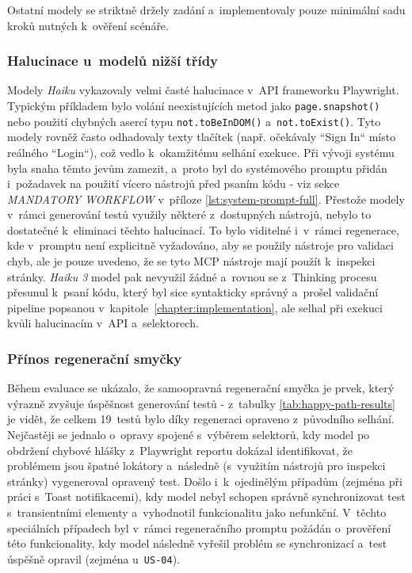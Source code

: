 \documentclass[czech, ing, kiv, he, iso690numb, viewonly]{fasthesis}
\begin{document}
Ostatní modely se striktně držely zadání a~implementovaly
pouze minimální sadu kroků nutných k~ověření scénáře.

\subsubsection*{Halucinace u~modelů nižší třídy}
Modely \textit{Haiku} vykazovaly velmi časté halucinace v~API frameworku Playwright.
Typickým příkladem bylo volání neexistujících metod jako \texttt{page.snapshot()} nebo použití
chybných asercí typu \texttt{not.toBeInDOM()} a~\texttt{not.toExist()}. 
Tyto modely rovněž často odhadovaly texty tlačítek (např. očekávaly ``Sign In`` místo reálného ``Login``), 
což vedlo k~okamžitému selhání exekuce. Při vývoji systému byla snaha těmto 
jevům zamezit, a~proto byl do systémového promptu přidán i~požadavek na použití vícero 
nástrojů před psaním kódu - viz sekce \textit{MANDATORY WORKFLOW} v~příloze \ref{lst:system-prompt-full}.
Přestože modely v~rámci generování testů využily některé z~dostupných nástrojů,
nebylo to dostatečné k~eliminaci těchto halucinací. To bylo viditelné i~v~rámci 
regenerace, kde v~promptu není explicitně vyžadováno, aby se použily nástroje pro validaci chyb, 
ale je pouze uvedeno, že se tyto MCP nástroje mají použít k~inspekci stránky. 
\textit{Haiku 3} model pak nevyužil žádné a~rovnou se z~Thinking procesu 
přesunul k~psaní kódu, který byl sice syntakticky správný a~prošel validační 
pipeline popsanou v~kapitole~\ref{chapter:implementation}, 
ale selhal při exekuci kvůli halucinacím v~API a~selektorech.

\subsubsection*{Přínos regenerační smyčky}
Během evaluace se ukázalo, že samoopravná regenerační smyčka je prvek, který 
výrazně zvyšuje úspěšnost generování testů - z~tabulky \ref{tab:happy-path-results} je vidět, 
že celkem 19~testů bylo díky regeneraci opraveno z~původního selhání.
Nejčastěji se jednalo o~opravy spojené s~výběrem selektorů, 
kdy model po obdržení chybové hlášky z~Playwright reportu dokázal identifikovat, 
že problémem jsou špatné lokátory a~následně (s~využitím nástrojů pro inspekci stránky)
vygeneroval opravený test. Došlo i~k~ojedinělým případům (zejména při práci s~Toast notifikacemi),
kdy model nebyl schopen správně synchronizovat test s~transientními elementy a~vyhodnotil funkcionalitu jako nefunkční. V~těchto speciálních případech byl
v~rámci regeneračního promptu požádán o~prověření této funkcionality,
kdy model následně vyřešil problém se synchronizací a~test úspěšně opravil (zejména u~\texttt{US-04}).
\end{document}
